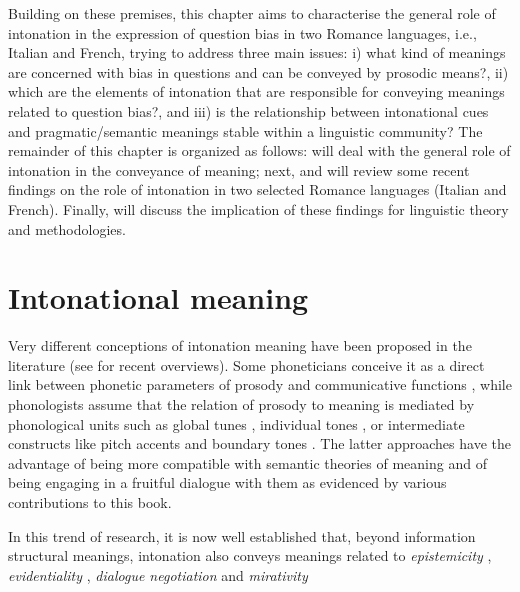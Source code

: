\documentclass[output=paper,colorlinks,citecolor=brown]{langscibook}
\begin{document}
Building on these premises, this chapter aims to characterise the general role of intonation in the expression of question bias in two Romance languages, i.e., Italian and French, trying to address three main issues: i) what kind of meanings are concerned with bias in questions and can be conveyed by prosodic means?, ii) which are the elements of intonation that are responsible for conveying meanings related to question bias?, and iii) is the relationship between intonational cues and pragmatic/semantic meanings stable within a linguistic community? The remainder of this chapter is organized as follows:  will deal with the general role of intonation in the conveyance of meaning; next,  and  will review some recent findings on the role of intonation in two selected Romance languages (Italian and French). Finally,  will discuss the implication of these findings for linguistic theory and methodologies.

\section{Intonational meaning}\label{sec:04:2}
Very different conceptions of intonation meaning have been proposed in the literature (see \citealt{Portes2015IsIM, Prieto2015, Westera2020MeaningsOT} for recent overviews). Some phoneticians conceive it as a direct link between phonetic parameters of prosody and communicative functions \citep{Local03, XU05}, while phonologists assume that the relation of prosody to meaning is mediated by phonological units such as global tunes \citep{gussenhoven_grammar_1984}, individual tones \citep{pierrehumbert_meaning_1990}, or intermediate constructs like pitch accents and boundary tones \citep{SteedmanInfoStru}. The latter approaches have the advantage of being more compatible with semantic theories of meaning and of being engaging in a fruitful dialogue with them as evidenced by various contributions to this book.

In this trend of research, it is now well established that, beyond information structural meanings, intonation also conveys meanings related to \textit{epistemicity} \citep[the commitment of the speaker/addressee towards the content of the utterance:][]{bartels99, gunlogson2003}, \textit{evidentiality} \citep[the source of information: speaker, addressee or else; ][]{gunlogson_question_2008, escandell-vidal_intonation_2017}, \textit{dialogue negotiation} \citep[agreement/disagreement:][]{SteedmanInfoStru} and \textit{mirativity} \citep[unexpected information:][]{DELANCEY2001369, Rett2013-RETASA, CeJugLanL18}
\end{document}
